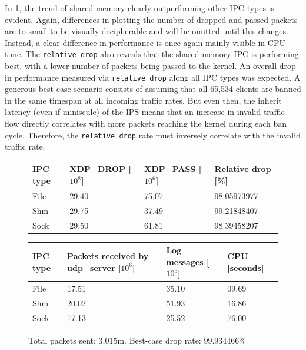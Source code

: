 In \ref{fig:data:ipv4:10m:65534}, the trend of shared memory clearly outperforming other \ac{IPC} types is evident.
Again, differences in plotting the number of dropped and passed packets are to small to be visually decipherable and will be omitted until this changes.
Instead, a clear difference in performance is once again mainly visible in \ac{CPU} time.
The \texttt{relative drop} also reveals that the shared memory \ac{IPC} is performing best, with a lower number of packets being passed to the kernel.
An overall drop in performance measured via \texttt{relative drop} along all \ac{IPC} types was expected.
A generous best-case scenario consists of assuming that all 65,534 clients are banned in the same timespan at all incoming traffic rates.
But even then, the inherit latency (even if miniscule) of the \ac{IPS} means that an increase in invalid traffic flow directly correlates with more packets reaching the kernel during each ban cycle.
Therefore, the \texttt{relative drop} rate must inversely correlate with the invalid traffic rate.

\begin{figure}[!h]
	\centering
	\scriptsize
	\begin{tabular}{llll}
		\toprule
		\textbf{IPC type} & \textbf{XDP\_DROP [$10^8$]} & \textbf{XDP\_PASS [$10^6$]} & \textbf{Relative drop [\%]} \\ \midrule 
		File & 29.40 & 75.07 & 98.05973977 \\
        Shm & 29.75 & 37.49 & 99.21848407 \\
        Sock & 29.50 & 61.81 & 98.39458207 \\
	\bottomrule
	\end{tabular}
    \begin{tabular}{llll}
		\toprule
		\textbf{IPC type} & \textbf{Packets received by udp\_server [$10^6$]} & \textbf{Log messages [$10^5$]} & \textbf{CPU [seconds]} \\ \midrule 
		File & 17.51 & 35.10 & 09.69 \\
        Shm & 20.02 & 51.93 & 16.86 \\
        Sock & 17.13 & 25.52 & 76.00 \\
	\bottomrule
	\end{tabular}
	\caption[Simplefail2ban, IPv4, 10m \ac{PPS}, 65,534 malicious clients]{Total packets sent: 3,015m. Best-case drop rate: 99.934466\%}
	\label{fig:data:ipv4:10m:65534}
\end{figure}

